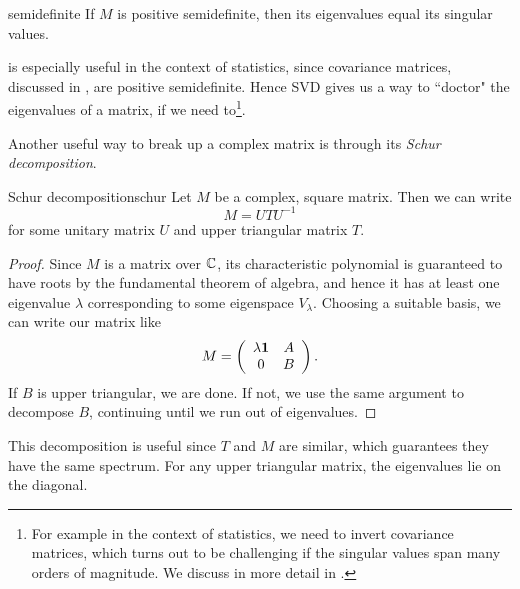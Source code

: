 \begin{proposition}{}{semidefinite}
If $M$ is positive semidefinite, then its eigenvalues equal its singular values.
\end{proposition}

 is especially useful in the context of statistics,
since covariance matrices, discussed in , are
positive semidefinite. Hence SVD gives us a way to ``doctor" the eigenvalues
of a matrix, if we need to\footnote{For example in the context of statistics,
we need to invert covariance matrices, which turns out to be challenging if
the singular values span many orders of magnitude. 
We discuss in more detail in .}. 


Another useful way to break up a complex matrix is through its
{\it Schur decomposition}.
\begin{theorem}{Schur decomposition}{schur}
  Let $M$ be a complex, square matrix.  Then we can write
$$
M=UTU^{-1}
$$
for some unitary matrix $U$ and upper triangular matrix $T$.
\begin{proof}
Since $M$ is a matrix over $\mathbb{C}$, its characteristic polynomial
is guaranteed to have roots by the fundamental theorem of algebra,
and hence it has at least one eigenvalue $\lambda$ corresponding
to some eigenspace $V_\lambda$. Choosing a suitable basis, we
can write our matrix like
$$
M= \left(\begin{array}{cc}
            \lambda{\mathbf 1} & A  \\
            0 & B   \\
            \end{array}\right).
$$
If $B$ is upper triangular, we are done. If not, we use the
same argument to decompose $B$, continuing until we run out
of eigenvalues.
\end{proof}
\end{theorem}
This decomposition is useful since $T$ and $M$ are similar, which
guarantees they have the same spectrum. For any upper triangular
matrix, the eigenvalues lie on the diagonal.

